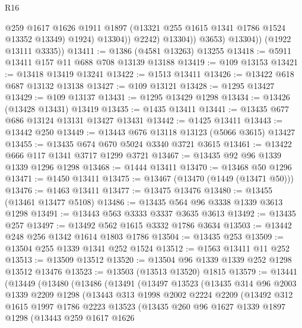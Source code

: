 \begin{lexlean}{R16}
\begin{coremodule}
                        @259
                        @1617
                        @1626
                        @1911
                        @1897
                        (@13321 @255 @1615 @1341 @1786 @1524 @13352 @13349)
                        @1924)
                      @13304))
                  @2242)
                @13304))
            @3653)
          @13304))
      (@1922 @13111 @3335))
@13411 := @1386 (@4581 @13263) @13255
@13418 := @5911 @13411 @157 @11 @688 @708 @13139 @13188
@13419 := @109 @13153
@13421 := @13418 @13419 @13241
@13422 := @1513 @13411
@13426 := @13422 @618 @687 @13132 @13138
@13427 := @109 @13121
@13428 := @1295 @13427
@13429 := @109 @13137
@13431 := @1295 @13429 @1298
@13434 := @13426 (@13428 @13431) @13419
@13435 := @1435 @13411
@13441 := @13435 @677 @686 @13124 @13131 @13427 @13431
@13442 := @1425 @13411
@13443 := @13442 @250
@13449 := @13443 @676 @13118 @13123 (@5066 @3615) @13427
@13455 := @13435 @674 @670 @5024 @3340 @3721 @3615
@13461 := @13422 @666 @117 @1341 @3717 @1299 @3721
@13467 := @13435 @92 @96 @1339 @1339 @1296 @1298
@13468 := @1444 @13411
@13470 := @13468 @50 @1296
@13471 := @1450 @13411
@13475 := @13467 (@13470 (@1449 (@13471 @50)))
@13476 := @1463 @13411
@13477 := @13475 @13476
@13480 := @13455 (@13461 @13477 @5108)
@13486 := @13435 @564 @96 @3338 @1339 @3613 @1298
@13491 := @13443 @563 @3333 @3337 @3635 @3613
@13492 := @13435 @257
@13497 := @13492 @562 @1615 @3332 @1786 @3634
@13503 := @13442 @248 @256 @1342 @1614 @1803 @1786
@13504 := @13435 @253
@13509 := @13504 @255 @1339 @1341 @252 @1524
@13512 := @1563 @13411 @11 @252
@13513 := @13509 @13512
@13520 := @13504 @96 @1339 @1339 @252 @1298 @13512 @13476
@13523 := @13503 (@13513 @13520) @1815
@13579 := @13441
    (@13449
      (@13480
        (@13486
          (@13491
            (@13497
              @13523
              (@13435
                @314
                @96
                @2003
                @1339
                @2209
                @1298
                (@13443
                  @313
                  @1998
                  @2002
                  @2224
                  @2209
                  (@13492
                    @312
                    @1615
                    @1997
                    @1786
                    @2223
                    @13523
                    (@13435
                      @260
                      @96
                      @1627
                      @1339
                      @1897
                      @1298
                      (@13443
                        @259
                        @1617
                        @1626

\end{coremodule}
\end{lexlean}
